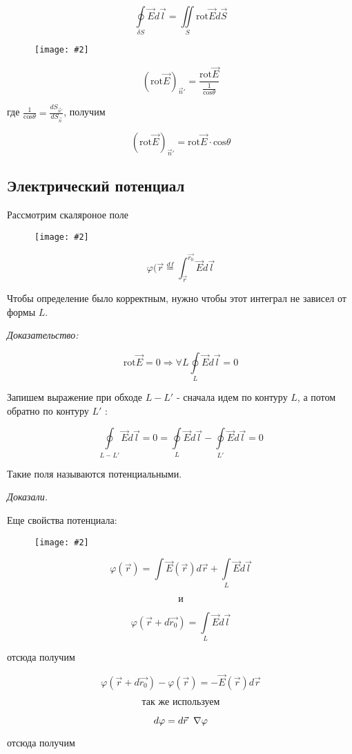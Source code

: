 \documentclass[a4paper,12pt]{article}
\newcommand{\kr}[1]{\textit{#1}}
\newcommand{\fc}[1]{\[#1\]}
\newcommand{\mm}[1]{\mathrm{#1}}
\newcommand{\gradd}{\hspace{0.2cm}\scriptsize \nabla}
\newcommand{\imc}[2][0.7\textwidth]{%
    \begin{figure}[h!]
        \centering
        \texttt{[image: \#2]}
    \end{figure}%
}
\begin{document}
\fc{\underset{\delta
S}{\oint}\vec{E}d\vec{l}=\underset{S}{\iint}\mm{rot}\vec{E}d\vec{S}}

\imc[0.5\textwidth]{6.png}

\fc{(\mm{rot}\vec{E})_{\vec{n}'}=\frac{\mm{rot}\vec{E}}{\frac{1}{\mm{cos}\theta
}}}

где $\frac{1}{\mm{cos}\theta}=\frac{dS_{\vec{n}'}}{dS_{\vec{n}}}$, получим

\fc{(\mm{rot}\vec{E})_{\vec{n}'}=\mm{rot}\vec{E}\cdot\mm{cos}\theta} 


\subsection*{Электрический потенциал}

Рассмотрим скаляроное поле

\imc[0.5\textwidth]{7.png}

\fc{\varphi(\vec{r}\overset{df}{=}\int_{\vec{r}}^{\vec{r_0}}\vec{E}d\vec{l}}

Чтобы определение было корректным, нужно чтобы этот интеграл не зависел от
формы $L$.

\kr{Доказательство:}

\fc{\mm{rot}\vec{E}=0 \Rightarrow \forall L
\underset{L}{\oint}\vec{E}d\vec{l}=0}

Запишем выражение при обходе $L-L'$ - сначала идем по контуру $L$, а
потом обратно по контуру $L'$ : 

\fc{\underset{L-L'}{\oint}\vec{E}d\vec{l}=0=\underset{L}{\oint}\vec{E}d\vec{l}
-\underset{L'}{\oint}\vec{E}d\vec{l}=0}

Такие поля называются потенциальными.

\kr{Доказали.}

Еще свойства потенциала: 

\imc[0.35\textwidth]{8.png}
   
\fc{\varphi(\vec{r})=\int \vec{E}(\vec{r})d\vec{r} + \underset{L}{\int}
\vec{E}d\vec{l} }

\fc{\text{и}}

\fc{\varphi(\vec{r}+d\vec{r_0})=\underset{L}{\int} \vec{E}d\vec{l}}
 
отсюда получим

\fc{\varphi(\vec{r}+d\vec{r_0})-\varphi(\vec{r})=-\vec{E}(\vec{r})d\vec{r}}

\fc{\text{так же используем}}

\fc{d\varphi=d\vec{r}\gradd \varphi }

отсюда получим
\end{document}
